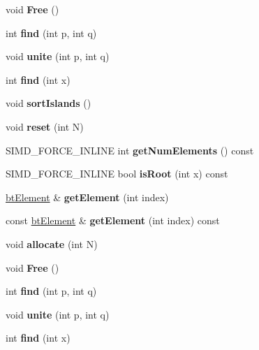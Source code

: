\begin{DoxyCompactItemize}
void {\bfseries Free} ()
\item 
\mbox{\label{classbtUnionFind_af4511d20a9dcb574a12f014361a99fc6}} 
int {\bfseries find} (int p, int q)
\item 
\mbox{\label{classbtUnionFind_a4cde43de719d34f1f79fde54ce792ee9}} 
void {\bfseries unite} (int p, int q)
\item 
\mbox{\label{classbtUnionFind_a2f10fea818127e0c80e3c7f0e355f0da}} 
int {\bfseries find} (int x)
\item 
\mbox{\label{classbtUnionFind_a8bf4647f84d20b033e0d0a7188f3b798}} 
void {\bfseries sort\+Islands} ()
\item 
\mbox{\label{classbtUnionFind_a2c0b1e855d522d3993fc5ba98dc8b1d4}} 
void {\bfseries reset} (int N)
\item 
\mbox{\label{classbtUnionFind_a77445a4744996039b1ab939b165b7765}} 
S\+I\+M\+D\+\_\+\+F\+O\+R\+C\+E\+\_\+\+I\+N\+L\+I\+NE int {\bfseries get\+Num\+Elements} () const
\item 
\mbox{\label{classbtUnionFind_aff344ac3713bb52baf65b3720ad2a7c0}} 
S\+I\+M\+D\+\_\+\+F\+O\+R\+C\+E\+\_\+\+I\+N\+L\+I\+NE bool {\bfseries is\+Root} (int x) const
\item 
\mbox{\label{classbtUnionFind_ab9c9ac633e6a3a43f90da29845b92bd3}} 
\hyperlink{structbtElement}{bt\+Element} \& {\bfseries get\+Element} (int index)
\item 
\mbox{\label{classbtUnionFind_a42a543d6400ed5833fc817ce8ab559f2}} 
const \hyperlink{structbtElement}{bt\+Element} \& {\bfseries get\+Element} (int index) const
\item 
\mbox{\label{classbtUnionFind_a4d4e2f8ef29c5f86f693d2340a5c377b}} 
void {\bfseries allocate} (int N)
\item 
\mbox{\label{classbtUnionFind_a4acdd17f2aa73146b25731caff4d0e86}} 
void {\bfseries Free} ()
\item 
\mbox{\label{classbtUnionFind_af4511d20a9dcb574a12f014361a99fc6}} 
int {\bfseries find} (int p, int q)
\item 
\mbox{\label{classbtUnionFind_a4cde43de719d34f1f79fde54ce792ee9}} 
void {\bfseries unite} (int p, int q)
\item 
\mbox{\label{classbtUnionFind_a2f10fea818127e0c80e3c7f0e355f0da}} 
int {\bfseries find} (int x)
\end{DoxyCompactItemize}


